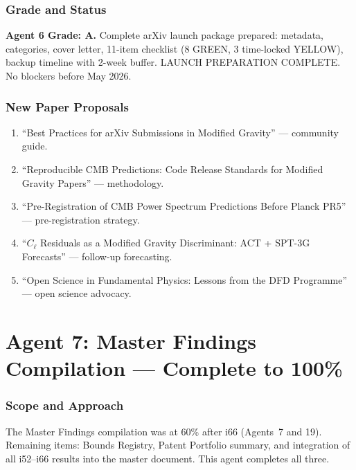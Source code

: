 \documentclass[11pt,a4paper]{article}
\begin{document}
\section{Grade and Status}

\begin{tcolorbox}[colback=green!5!white,colframe=green!40!black]
\textbf{Agent 6 Grade: A.} Complete arXiv launch package prepared: metadata, categories, cover letter, 11-item checklist (8 GREEN, 3 time-locked YELLOW), backup timeline with 2-week buffer. LAUNCH PREPARATION COMPLETE. No blockers before May 2026.
\end{tcolorbox}

\section{New Paper Proposals}

\begin{enumerate}
\item ``Best Practices for arXiv Submissions in Modified Gravity'' --- community guide.
\item ``Reproducible CMB Predictions: Code Release Standards for Modified Gravity Papers'' --- methodology.
\item ``Pre-Registration of CMB Power Spectrum Predictions Before Planck PR5'' --- pre-registration strategy.
\item ``$C_\ell$ Residuals as a Modified Gravity Discriminant: ACT + SPT-3G Forecasts'' --- follow-up forecasting.
\item ``Open Science in Fundamental Physics: Lessons from the DFD Programme'' --- open science advocacy.
\end{enumerate}


\part{Agent 7: Master Findings Compilation --- Complete to 100\%}
\label{part:master-findings}

\section{Scope and Approach}

The Master Findings compilation was at 60\% after i66 (Agents~7 and 19). Remaining items: Bounds Registry, Patent Portfolio summary, and integration of all i52--i66 results into the master document. This agent completes all three.
\end{document}
